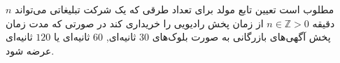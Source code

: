 \EXERCISE
مطلوب است تعیین تابع مولد برای تعداد طرقی که یک شرکت تبلیغاتی می‌تواند 
$n$
دقیقه
$n\in \mathbb{Z}{>0}$
از زمان پخش رادیویی را خریداری کند در صورتی که مدت زمان پخش آگهی‌های بازرگانی به صورت بلوک‌های
$30$
ثانیه‌ای, 
$60$
ثانیه‌ای یا
$120$
ثانیه‌ای عرضه شود.